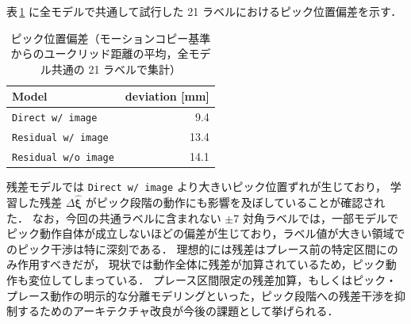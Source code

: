 表\,\ref{tab:pick_dev} に全モデルで共通して試行した 21 ラベルにおけるピック位置偏差を示す．

\begin{table}[t]
  \centering
  \caption{ピック位置偏差（モーションコピー基準からのユークリッド距離の平均，全モデル共通の 21 ラベルで集計）}
  \label{tab:pick_dev}
  \small
  \begin{tabular}{lr}
    \hline
    Model & deviation [mm] \\
    \hline
    \texttt{Direct w/ image}    & 9.4  \\
    \texttt{Residual w/ image}  & 13.4 \\
    \texttt{Residual w/o image} & 14.1 \\
    \hline
  \end{tabular}
\end{table}

残差モデルでは \texttt{Direct w/ image} より大きいピック位置ずれが生じており，
学習した残差 $\Delta\hat{\bm{\xi}}$ がピック段階の動作にも影響を及ぼしていることが確認された．
なお，今回の共通ラベルに含まれない $\pm 7$ 対角ラベルでは，一部モデルでピック動作自体が成立しないほどの偏差が生じており，ラベル値が大きい領域でのピック干渉は特に深刻である．
理想的には残差はプレース前の特定区間にのみ作用すべきだが，
現状では動作全体に残差が加算されているため，ピック動作も変位してしまっている．
プレース区間限定の残差加算，もしくはピック・プレース動作の明示的な分離モデリングといった，ピック段階への残差干渉を抑制するためのアーキテクチャ改良が今後の課題として挙げられる．
